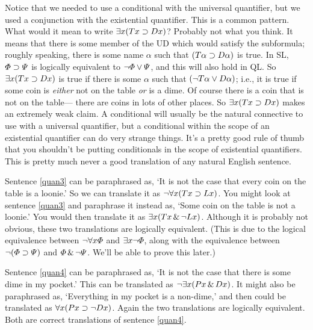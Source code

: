 Notice that we needed to use a conditional with the universal quantifier, but we used a conjunction with the existential quantifier. This is a common pattern. What would it mean to write $\exists x(Tx \supset Dx)$? Probably not what you think. It means that there is some member of the UD which would satisfy the subformula; roughly speaking, there is some name $\alpha$ such that $(T\alpha \supset D\alpha)$ is true. In SL, $\varPhi{} \supset \varPsi{}$ is logically equivalent to $\neg\varPhi{} \vee \varPsi{}$, and this will also hold in QL. So $\exists x(Tx \supset Dx)$ is true if there is some $\alpha$ such that $(\neg T\alpha \vee D\alpha)$; i.e., it is true if some coin is \emph{either} not on the table \emph{or} is a dime. Of course there is a coin that is not on the table--- there are coins in lots of other places. So $\exists x(Tx \supset Dx)$ makes an extremely weak claim. A conditional will usually be the natural connective to use with a universal quantifier, but a conditional within the scope of an existential quantifier can do very strange things. It's a pretty good rule of thumb that you shouldn't be putting conditionals in the scope of existential quantifiers. This is pretty much never a good translation of any natural English sentence.

Sentence \ref{quan3} can be paraphrased as, `It is not the case that every coin on the table is a loonie.' So we can translate it as $\neg \forall x(Tx \supset Lx)$. You might look at sentence \ref{quan3} and paraphrase it instead as, `Some coin on the table is not a loonie.' You would then translate it as $\exists x(Tx \,\&\, \neg Lx)$. Although it is probably not obvious, these two translations are logically equivalent. (This is due to the logical equivalence between $\neg\forall x\varPhi{}$ and $\exists x\neg\varPhi{}$, along with the equivalence between $\neg(\varPhi{}\supset\varPsi{})$ and $\varPhi{}\,\&\,\neg\varPsi{}$. We'll be able to prove this later.)

Sentence \ref{quan4} can be paraphrased as, `It is not the case that there is some dime in my pocket.' This can be translated as $\neg\exists x(Px \,\&\, Dx)$. It might also be paraphrased as, `Everything in my pocket is a non-dime,' and then could be translated as $\forall x(Px \supset \neg Dx)$. Again the two translations are logically equivalent. Both are correct translations of sentence \ref{quan4}.

